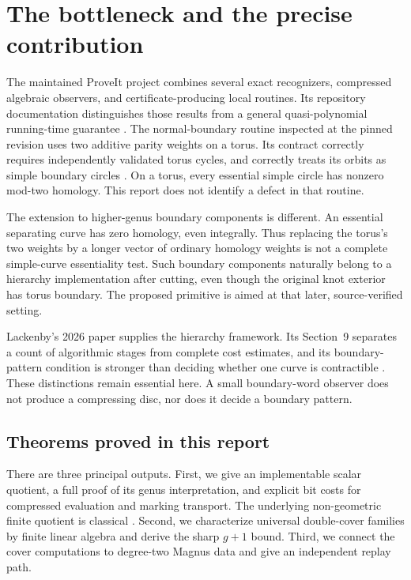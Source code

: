 \documentclass[11pt,letterpaper]{article}
\theoremstyle{definition}
\theoremstyle{remark}
\begin{document}
\hypersetup{pageanchor=true}
\begingroup
\setlength{\parskip}{0pt}
\small
\tableofcontents
\endgroup
\newpage
{}

\section{The bottleneck and the precise contribution}
\label{sec:introduction}
The maintained ProveIt project combines several exact recognizers, compressed algebraic observers, and certificate-producing local routines. Its repository documentation distinguishes those results from a general quasi-polynomial running-time guarantee \cite{repo}. The normal-boundary routine inspected at the pinned revision uses two additive parity weights on a torus. Its contract correctly requires independently validated torus cycles, and correctly treats its orbits as simple boundary circles \cite{nativeboundary}. On a torus, every essential simple circle has nonzero mod-two homology. This report does not identify a defect in that routine.

The extension to higher-genus boundary components is different. An essential separating curve has zero homology, even integrally. Thus replacing the torus's two weights by a longer vector of ordinary homology weights is not a complete simple-curve essentiality test. Such boundary components naturally belong to a hierarchy implementation after cutting, even though the original knot exterior has torus boundary. The proposed primitive is aimed at that later, source-verified setting.

Lackenby's 2026 paper supplies the hierarchy framework. Its Section~9 separates a count of algorithmic stages from complete cost estimates, and its boundary-pattern condition is stronger than deciding whether one curve is contractible \cite{lackenby}. These distinctions remain essential here. A small boundary-word observer does not produce a compressing disc, nor does it decide a boundary pattern.

\subsection{Theorems proved in this report}
There are three principal outputs. First, we give an implementable scalar quotient, a full proof of its genus interpretation, and explicit bit costs for compressed evaluation and marking transport. The underlying non-geometric finite quotient is classical \cite{livingston,pikaart}. Second, we characterize universal double-cover families by finite linear algebra and derive the sharp $g+1$ bound. Third, we connect the cover computations to degree-two Magnus data and give an independent replay path.
\end{document}
